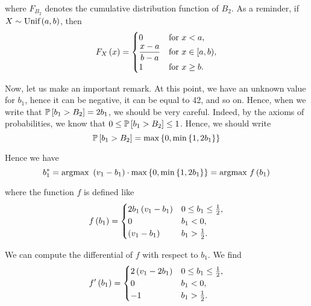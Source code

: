 where $F_{B_2}$ denotes the cumulative distribution function of $B_{2}$. As a reminder, if $X \sim \text{Unif} \parent{a, b}$, then
\begin{equation*}
F_{X} \parent{x} =
\begin{cases}
    0                   & {\text{for }} x<a, \\
    \dfrac{x-a}{b-a}    & {\text{for }} x \in [a,b), \\
    1                   & {\text{for }} x \geq b.
\end{cases}
\end{equation*}

\vspace{5mm}

Now, let us make an important remark. At this point, we have an unknown value for $b_1$, hence it can be negative, it can be equal to 42, and so on. Hence, when we write that $\mathbb{P} \squared{b_1 > B_2} = 2 b_1$, we should be very careful. Indeed, by the axioms of probabilities, we know that $0 \leq \mathbb{P} \squared{b_1 > B_2} \leq 1$. Hence, we should write
\begin{equation*}
    \mathbb{P} \squared{b_1 > B_2} = \max \bracket{0, \min \bracket{1, 2 b_1}}
\end{equation*}

Hence we have
\begin{equation*}
    b_1^{*}
    = \text{argmax} \ \parent{v_1 - b_1} \cdot \max \bracket{0, \min \bracket{1, 2 b_1}}
    = \text{argmax} \ f \parent{b_1}
\end{equation*}

where the function $f$ is defined like
\begin{equation*}
    f \parent{b_1}
    =
    \begin{cases}
       2 b_1 \parent{v_1 - b_1}  & 0 \leq b_1 \leq \frac{1}{2}, \\
       0 & b_1 < 0, \\
       \parent{v_1 - b_1} & b_1 > \frac{1}{2}. \\
     \end{cases}
\end{equation*}

We can compute the differential of $f$ with respect to $b_1$. We find
\begin{equation*}
    f' \parent{b_1}
    =
    \begin{cases}
       2 \parent{v_1 - 2 b_1}  & 0 \leq b_1 \leq \frac{1}{2}, \\
       0 & b_1 < 0, \\
       -1 & b_1 > \frac{1}{2}. \\
     \end{cases}
\end{equation*}

